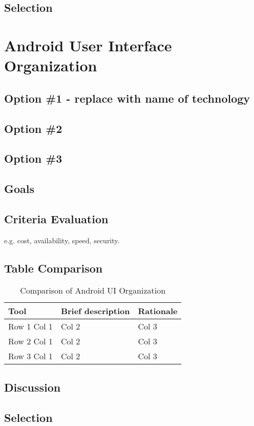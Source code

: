 \documentclass[letterpaper,10pt,draftclsnofoot,onecolumn,titlepage]{IEEEtran}
\begin{document}
		\subsection{Selection}

	\section{Android User Interface Organization}
	\subsection{Option \#1 - replace with name of technology}
	\subsection{Option \#2}
	\subsection{Option \#3}
	\subsection{Goals}
	\subsection{Criteria Evaluation}
	e.g. cost, availability, speed, security.
	\subsection{Table Comparison}
	\begin{table}[ht]
	\caption{Comparison of Android UI Organization}
	\begin{center}
	\begin{tabular} { | m{3cm} | m{5cm} | m{5cm} | }
	\hline\hline
	Tool & Brief description & Rationale \\ [0.5ex]
	\hline
	Row 1 Col 1 & Col 2 & Col 3 \\
	\hline
	Row 2 Col 1 & Col 2 & Col 3 \\
	\hline
	Row 3 Col 1 & Col 2 & Col 3 \\
	\hline
	\end{tabular}
	\end{center}
	\end{table}
	\subsection{Discussion}
	\subsection{Selection}
\end{document}
